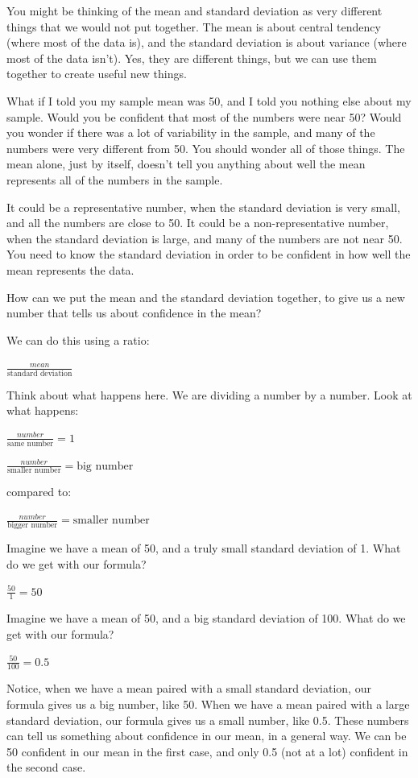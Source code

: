 \documentclass[
  letterpaper,
  DIV=11,
  numbers=noendperiod]{scrreprt}
\begin{document}
You might be thinking of the mean and standard deviation as very
different things that we would not put together. The mean is about
central tendency (where most of the data is), and the standard deviation
is about variance (where most of the data isn't). Yes, they are
different things, but we can use them together to create useful new
things.

What if I told you my sample mean was 50, and I told you nothing else
about my sample. Would you be confident that most of the numbers were
near 50? Would you wonder if there was a lot of variability in the
sample, and many of the numbers were very different from 50. You should
wonder all of those things. The mean alone, just by itself, doesn't tell
you anything about well the mean represents all of the numbers in the
sample.

It could be a representative number, when the standard deviation is very
small, and all the numbers are close to 50. It could be a
non-representative number, when the standard deviation is large, and
many of the numbers are not near 50. You need to know the standard
deviation in order to be confident in how well the mean represents the
data.

How can we put the mean and the standard deviation together, to give us
a new number that tells us about confidence in the mean?

We can do this using a ratio:

\(\frac{mean}{\text{standard deviation}}\)

Think about what happens here. We are dividing a number by a number.
Look at what happens:

\(\frac{number}{\text{same number}} = 1\)

\(\frac{number}{\text{smaller number}} = \text{big number}\)

compared to:

\(\frac{number}{\text{bigger number}} = \text{smaller number}\)

Imagine we have a mean of 50, and a truly small standard deviation of 1.
What do we get with our formula?

\(\frac{50}{1} = 50\)

Imagine we have a mean of 50, and a big standard deviation of 100. What
do we get with our formula?

\(\frac{50}{100} = 0.5\)

Notice, when we have a mean paired with a small standard deviation, our
formula gives us a big number, like 50. When we have a mean paired with
a large standard deviation, our formula gives us a small number, like
0.5. These numbers can tell us something about confidence in our mean,
in a general way. We can be 50 confident in our mean in the first case,
and only 0.5 (not at a lot) confident in the second case.
\end{document}
